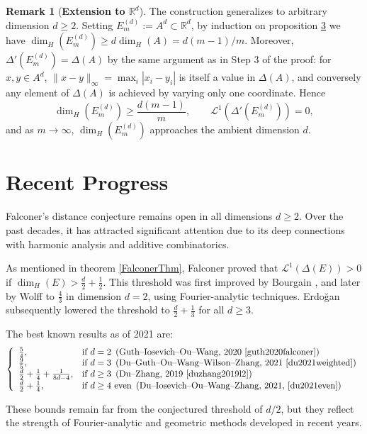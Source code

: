 \documentclass[12pt,a4paper]{report}
\theoremstyle{definition}
\newtheorem{remark}{Remark}
\begin{document}
\begin{remark}[\textbf{Extension to $\mathbb{R}^d$}]
The construction generalizes to arbitrary dimension $d \geq 2$. Setting $E_m^{(d)} := A^d \subset \mathbb{R}^d$, by induction on proposition \hyperref[prop1.24]{3} we have $\dim_H(E_m^{(d)}) \geq d \dim_H(A) = d(m-1)/m$. Moreover, $\Delta'(E_m^{(d)}) = \Delta(A)$ by the same argument as in Step 3 of the proof: for $x, y \in A^d$, $\|x-y\|_\infty = \max_i |x_i - y_i|$ is itself a value in $\Delta(A)$, and conversely any element of $\Delta(A)$ is achieved by varying only one coordinate. Hence
\[
\dim_H(E_m^{(d)}) \geq \frac{d(m-1)}{m}, \qquad \mathcal{L}^1(\Delta'(E_m^{(d)})) = 0,
\]
and as $m \to \infty$, $\dim_H(E_m^{(d)})$ approaches the ambient dimension $d$.
\end{remark}

\section{Recent Progress}

Falconer’s distance conjecture remains open in all dimensions \( d \ge 2 \). Over the past decades, it has attracted significant attention due to its deep connections with harmonic analysis and additive combinatorics.

As mentioned in theorem \ref{FalconerThm}, Falconer proved that \( \mathcal{L}^1(\Delta(E)) > 0 \) if \( \dim_H(E) > \frac{d}{2} + \frac{1}{2} \). This threshold was first improved by Bourgain \cite{bourgain1994distance}, and later by Wolff \cite{wolff1999decay} to \( \frac{4}{3} \) in dimension \( d = 2 \), using Fourier-analytic techniques. Erdoğan \cite{erdogan2005bilinear} subsequently lowered the threshold to \( \frac{d}{2} + \frac{1}{3} \) for all \( d \ge 3 \).

The best known results as of 2021 are:
\[
\left\{
\begin{array}{ll}
\frac{5}{4}, & \text{if } d = 2 \hspace{0.17 cm} \text{(Guth–Iosevich–Ou–Wang, 2020 \cite{guth2020falconer})} \\
\frac{9}{5}, & \text{if } d = 3 \hspace{0.17 cm} \text{(Du–Guth–Ou–Wang–Wilson–Zhang, 2021 \cite{du2021weighted})} \\
\frac{d}{2} + \frac{1}{4} + \frac{1}{8d - 4}, & \text{if } d \ge 3 \hspace{0.17 cm} \text{(Du–Zhang, 2019 \cite{duzhang2019l2}) } \\
\frac{d}{2} + \frac{1}{4}, & \text{if } d \ge 4 \text{ even} \hspace{0.17 cm} \text{(Du–Iosevich–Ou–Wang–Zhang, 2021, \cite{du2021even})}
\end{array}
\right.
\]

These bounds remain far from the conjectured threshold of \( d/2 \), but they reflect the strength of Fourier-analytic and geometric methods developed in recent years.




\end{document}
